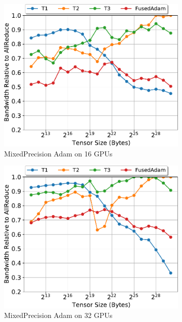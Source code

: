 \begin{figure}
  \begin{subfigure}{0.66\columnwidth}
    \includegraphics[width=\columnwidth]{figures/results-adamfp16-16-gpus.pdf} 
    \caption{MixedPrecision Adam on 16 GPUs} 
  \end{subfigure}
  \begin{subfigure}{0.66\columnwidth}
    \includegraphics[width=\columnwidth]{figures/results-adamfp16-32-gpus.pdf}  
    \caption{MixedPrecision Adam on 32 GPUs} 
  \end{subfigure}
  \begin{subfigure}{0.66\columnwidth}

\end{subfigure}
\end{figure}
